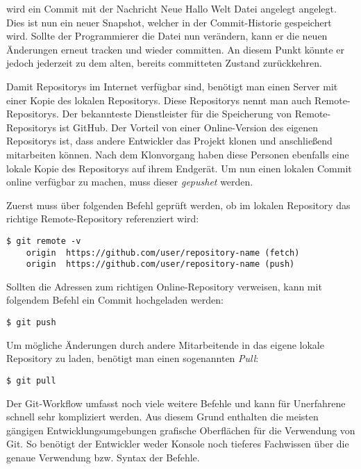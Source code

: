 wird ein Commit mit der Nachricht \glqq Neue Hallo Welt Datei angelegt\grqq{}
angelegt. Dies ist nun ein neuer Snapshot, welcher in der Commit-Historie
gespeichert wird. Sollte der Programmierer die Datei nun verändern, kann er die
neuen Änderungen erneut tracken und wieder committen. An diesem Punkt könnte er
jedoch jederzeit zu dem alten, bereits committeten Zustand zurückkehren.

Damit Repositorys im Internet verfügbar sind, benötigt man einen Server mit
einer Kopie des lokalen Repositorys. Diese Repositorys nennt man auch
Remote-Repositorys. Der bekannteste Dienstleister für die Speicherung
von Remote-Repositorys ist GitHub. Der Vorteil von einer Online-Version des
eigenen Repositorys ist, dass andere Entwickler das Projekt klonen und
anschließend mitarbeiten können. Nach dem Klonvorgang haben diese Personen
ebenfalls eine lokale Kopie des Repositorys auf ihrem Endgerät. Um nun einen
lokalen Commit online verfügbar zu machen, muss dieser \emph{gepushet} werden.

Zuerst muss über folgenden Befehl geprüft werden, ob im lokalen Repository das
richtige Remote-Repository referenziert wird:

\begin{lstlisting}[style=Bash]
    $ git remote -v
    origin	https://github.com/user/repository-name (fetch)
    origin	https://github.com/user/repository-name (push)
\end{lstlisting}

Sollten die Adressen zum richtigen Online-Repository verweisen, kann mit
folgendem Befehl ein Commit hochgeladen werden:

\begin{lstlisting}[style=Bash]
    $ git push
\end{lstlisting}

\newpage

Um mögliche Änderungen durch andere Mitarbeitende in das eigene lokale
Repository zu laden, benötigt man einen sogenannten \emph{Pull}:

\begin{lstlisting}[style=Bash]
    $ git pull
\end{lstlisting}

Der Git-Workflow umfasst noch viele weitere Befehle und kann für Unerfahrene
schnell sehr kompliziert werden. Aus diesem Grund enthalten die meisten gängigen
Entwicklungsumgebungen grafische Oberflächen für die Verwendung von Git. So
benötigt der Entwickler weder Konsole noch tieferes Fachwissen über die genaue
Verwendung bzw. Syntax der Befehle.

